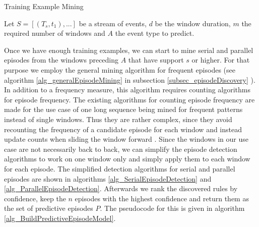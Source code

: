 \begin{algorithm}[H]
  \caption{Training Example Mining
    \label{alg_traningExampleMining}}
  \begin{algorithmic}[1]
    \Statex
    \Require Let $S=[(T_s,t_1),...]$ be a stream of events, $d$ be the window duration, $m$ the required number of windows and $A$ the event type to predict.
          	\EndIf
       	\EndIf
      \EndWhile
      \State {}
    \EndFunction
  \end{algorithmic}
\end{algorithm}

Once we have enough training examples, we can start to mine serial and parallel episodes from the windows preceding $A$ that have support $s$ or higher. For that purpose we employ the general mining algorithm for frequent episodes (see algorithm \ref{alg_generalEpisodeMining} in subsection \ref{subsec_episodeDiscovery} ). In addition to a frequency measure, this algorithm requires counting algorithms for episode frequency. The existing algorithms for counting episode frequency are made for the use case of one long sequence being mined for frequent patterns instead of single windows. Thus they are rather complex, since they avoid recounting the frequency of a candidate episode for each window and instead update counts when sliding the window forward \cite{mannila1997discovery}. Since the windows in our use case are not necessarily back to back, we can simplify the episode detection algorithms to work on one window only and simply apply them to each window for each episode. The simplified detection algorithms for serial and parallel episodes are shown in algorithms \ref{alg_SerialEpisodeDetection} and \ref{alg_ParallelEpisodeDetection}. Afterwards we rank the discovered rules by confidence, keep the $n$ episodes with the highest confidence and return them as the set of predictive episodes $P$. The pseudocode for this is given in algorithm \ref{alg_BuildPredictiveEpisodeModel}.

